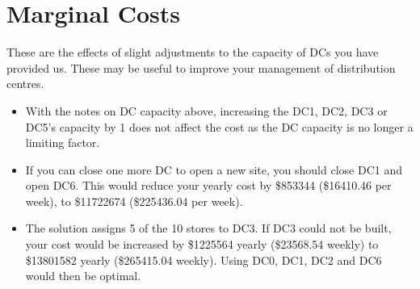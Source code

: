 \documentclass[11pt,a4paper]{article}
\begin{document}
\section{Marginal Costs}
These are the effects of slight adjustments to the capacity of DCs 
 you have provided us. These may be useful to improve your management of 
 distribution centres. 
\begin{itemize}
    \item With the notes on DC capacity above, increasing the DC1, DC2, DC3 or DC5's
    capacity by 1 does not affect the cost as the DC capacity is no longer a 
    limiting factor.
    \item If you can close one more DC to open a new site, you should close 
    DC1 and open DC6. This would reduce your yearly cost by \$853344 (\$16410.46 per week),
    to \$11722674 (\$225436.04 per week).
    \item The solution assigns 5 of the 10 stores to DC3. If DC3 could not be built, 
    your cost would be increased by \$1225564 yearly (\$23568.54 weekly) 
    to \$13801582 yearly (\$265415.04 weekly). Using DC0, DC1, DC2 and DC6 would 
    then be optimal.
\end{itemize}
\end{document}
